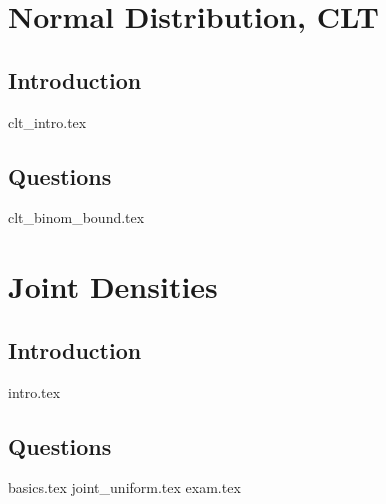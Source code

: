 \documentclass{exam}
\begin{document}
\section{Normal Distribution, CLT}
\subsection{Introduction}  
{clt_intro.tex}
\subsection{Questions}
\begin{questions}
    {clt_binom_bound.tex}
\end{questions} 



\section{Joint Densities}
\subsection{Introduction}
	{intro.tex}
\subsection{Questions}
\begin{questions}
	{basics.tex}
	{joint_uniform.tex}
	{exam.tex}
\end{questions}
\end{document}
